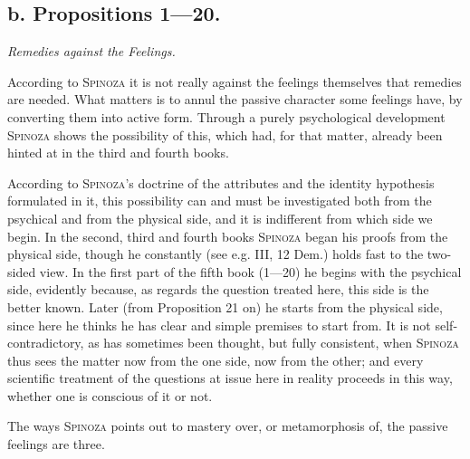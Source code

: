 \documentclass[12pt]{article}
\begin{document}
\subsection*{b. Propositions 1---20.}
\begin{center}\textit{Remedies against the Feelings.}\end{center}

According to \textsc{Spinoza} it is not really against the feelings themselves that remedies are
needed. What matters is to annul the passive character some feelings have, by converting them into
active form. Through a purely psychological development \textsc{Spinoza} shows the possibility of
this, which had, for that matter, already been hinted at in the third and fourth books.

According to \textsc{Spinoza}'s doctrine of the attributes and the identity hypothesis formulated in
it, this possibility can and must be investigated both from the psychical and from the physical
side, and it is indifferent from which side we begin. In the second, third and fourth books
\textsc{Spinoza} began his proofs from the physical side, though he constantly (see e.g. III, 12
Dem.) holds fast to the two-sided view. In the first part of the fifth book (1---20) he begins with
the psychical side, evidently because, as regards the question treated here, this side is the
better known. Later (from Proposition 21 on) he starts from the physical side, since here he thinks
he has clear and simple premises to start from. It is not self-contradictory, as has sometimes been
thought, but fully consistent, when \textsc{Spinoza} thus sees the matter now from the one side, now
from the other; and every scientific treatment of the questions at issue here in reality proceeds
in this way, whether one is conscious of it or not.

The ways \textsc{Spinoza} points out to mastery over, or metamorphosis of, the passive feelings are
three.
\end{document}
